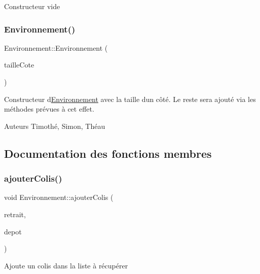 Constructeur vide \mbox{\label{class_environnement_a47869a858cb9d9ef3fdae28410646691}} 
\subsubsection{\texorpdfstring{Environnement()}{Environnement()}\hspace{0.1cm}{\footnotesize\ttfamily [2/2]}}
{\footnotesize\ttfamily Environnement\+::\+Environnement (\begin{DoxyParamCaption}\item[{const float}]{taille\+Cote }\end{DoxyParamCaption})}

Constructeur d\textquotesingle{}\mbox{\hyperlink{class_environnement}{Environnement}} avec la taille d\textquotesingle{}un côté. Le reste sera ajouté via les méthodes prévues à cet effet.

\begin{DoxyAuthor}{Auteurs}
Timothé, Simon, Théau 
\end{DoxyAuthor}


\subsection{Documentation des fonctions membres}
\mbox{\label{class_environnement_aab113d02197cc05b272ff66876cca4f1}} 
\subsubsection{\texorpdfstring{ajouter\+Colis()}{ajouterColis()}}
{\footnotesize\ttfamily void Environnement\+::ajouter\+Colis (\begin{DoxyParamCaption}\item[{const \mbox{\hyperlink{class_vecteur_r3}{Vecteur\+R3}} \&}]{retrait,  }\item[{const \mbox{\hyperlink{class_vecteur_r3}{Vecteur\+R3}} \&}]{depot }\end{DoxyParamCaption})}

Ajoute un colis dans la liste à récupérer \mbox{\label{class_environnement_ae6251ccc61f336420464c300fdc87bb6}} 
